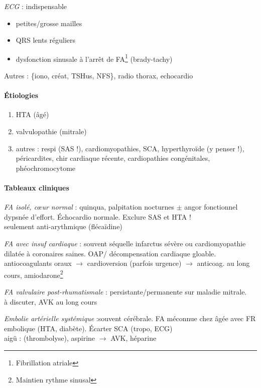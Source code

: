 \documentclass{article}
\def\arrow{$\rightarrow$}
\begin{document}
\textit{ECG} : indispensable \danger
\begin{itemize}
  \item petites/grosse mailles
  \item QRS lents réguliers
  \item dysfonction sinusale à l'arrêt de FA\footnote{Fibrillation atriale}
    (brady-tachy)
\end{itemize}

Autres : \{iono, créat, TSHus, NFS\}, radio thorax, echocardio

\paragraph{Étiologies}
\begin{enumerate}
  \item HTA (âgé)
  \item valvulopathie (mitrale)
  \item autres : respi (SAS !), cardiomyopathies, SCA, hyperthyroïde (y penser
    !), péricardites, chir cardiaque récente, cardiopathies congénitales,
    phéochromocytome
\end{enumerate}

\paragraph{Tableaux cliniques}
\textit{FA isolé, c\oe{}ur normal} : quinqua, palpitation nocturnes $\pm$ angor
fonctionnel \lor{} dypsnée d'effort. Échocardio normale. Exclure SAS et HTA !\\
\thus seulement anti-arythmique (flécaïdine)

\textit{FA avec insuf cardiaque} : souvent séquelle infarctus sévère ou
cardiomyopathie dilatée à coronaires saines. OAP/ décompensation cardiaque
gloable.\\
\thus antiocoagulants oraux \arrow{} cardioversion (parfois urgence) \arrow{}
anticoag. au long cours, amiodarone\footnote{Maintien rythme sinusal}

\textit{FA valvulaire post-rhumatismale}  : persistante/permanente sur maladie
mitrale. \\
\thus à discuter, AVK au long cours

\textit{Embolie artérielle systémique} :souvent cérébrale. FA méconnue chez
\female âgée avec FR embolique (HTA, diabète). Écarter SCA (tropo, ECG)\\
\thus aigü : (thrombolyse), aspirine \arrow{} AVK, héparine
\end{document}
